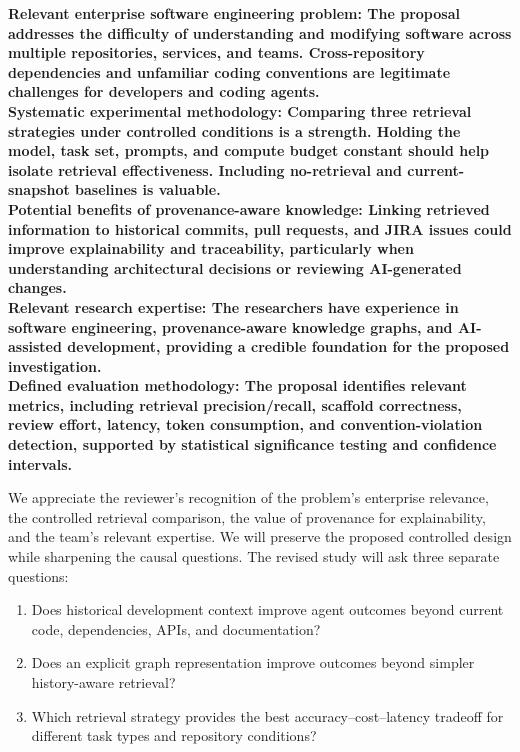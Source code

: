 \documentclass[11pt]{article}
\begin{document}
\textbf{Relevant enterprise software engineering problem: The proposal addresses the difficulty of understanding and modifying software across multiple repositories, services, and teams. Cross-repository dependencies and unfamiliar coding conventions are legitimate challenges for developers and coding agents.\\
Systematic experimental methodology: Comparing three retrieval strategies under controlled conditions is a strength. Holding the model, task set, prompts, and compute budget constant should help isolate retrieval effectiveness. Including no-retrieval and current-snapshot baselines is valuable.\\
Potential benefits of provenance-aware knowledge: Linking retrieved information to historical commits, pull requests, and JIRA issues could improve explainability and traceability, particularly when understanding architectural decisions or reviewing AI-generated changes.\\
Relevant research expertise: The researchers have experience in software engineering, provenance-aware knowledge graphs, and AI-assisted development, providing a credible foundation for the proposed investigation.\\
Defined evaluation methodology: The proposal identifies relevant metrics, including retrieval precision/recall, scaffold correctness, review effort, latency, token consumption, and convention-violation detection, supported by statistical significance testing and confidence intervals.}

We appreciate the reviewer’s recognition of the problem’s enterprise relevance, the controlled retrieval comparison, the value of provenance for explainability, and the team’s relevant expertise. We will preserve the proposed controlled design while sharpening the causal questions. The revised study will ask three separate questions:

\begin{enumerate}
  \item Does historical development context improve agent outcomes beyond current code, dependencies, APIs, and documentation?
  \item Does an explicit graph representation improve outcomes beyond simpler history-aware retrieval?
  \item Which retrieval strategy provides the best accuracy--cost--latency tradeoff for different task types and repository conditions?
\end{enumerate}
\end{document}
